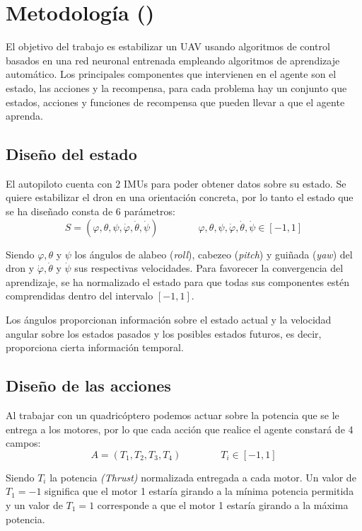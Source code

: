 \chapter{Metodología ()}

El objetivo del trabajo es estabilizar un UAV usando algoritmos de control basados en una red neuronal entrenada empleando algoritmos de aprendizaje automático. Los principales componentes que intervienen en el agente son el estado, las acciones y la recompensa, para cada problema hay un conjunto que estados, acciones y funciones de recompensa que pueden llevar a que el agente aprenda.

\section{Diseño del estado}
 El autopiloto cuenta con 2 IMUs para poder obtener datos sobre su estado. Se quiere estabilizar el dron en una orientación concreta, por lo tanto el estado que se ha diseñado consta de 6 parámetros:
\begin{equation}
	S=(\varphi,\theta,\psi,\dot\varphi,\dot\theta,\dot\psi) \qquad\qquad \varphi,\theta,\psi,\dot\varphi,\dot\theta,\dot\psi \in [-1,1]
\end{equation} 

Siendo $\varphi,\theta$ y $\psi$ los ángulos de alabeo (\textit{roll}), cabezeo (\textit{pitch}) y guiñada (\textit{yaw}) del dron  y $\dot\varphi,\dot\theta$ y $\dot\psi$ sus respectivas velocidades. Para favorecer la convergencia del aprendizaje, se ha normalizado el estado para que todas sus componentes estén comprendidas dentro del intervalo $[-1,1]$.

Los ángulos proporcionan información sobre el estado actual y la velocidad angular sobre los estados pasados y los posibles estados futuros, es decir, proporciona cierta información temporal. 

\section{Diseño de las acciones}
Al trabajar con un quadricóptero podemos actuar sobre la potencia que se le entrega a los motores, por lo que cada acción que realice el agente constará de 4 campos:
\begin{equation}
	A = (T_1,T_2,T_3,T_4) \qquad\qquad T_i \in [-1,1]
\end{equation}

Siendo $T_i$ la potencia \textit{(Thrust)} normalizada entregada a cada motor. Un valor de $T_1=-1$ significa que el motor 1 estaría girando a la mínima potencia permitida y un valor de $T_1=1$ corresponde a que el motor 1 estaría girando a la máxima potencia.\\

